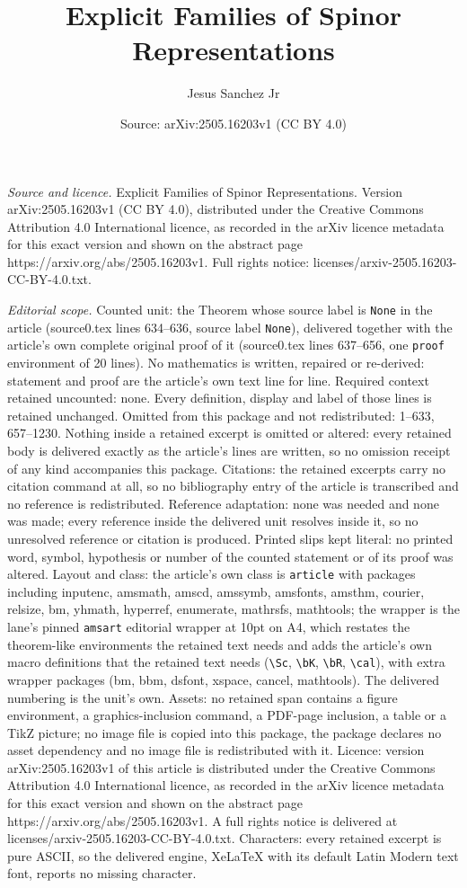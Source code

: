 \documentclass[10pt,a4paper]{amsart}
\title[Explicit Families of Spinor Representations]{Explicit Families of Spinor Representations}
\author{Jesus Sanchez Jr}
\date{Source: arXiv:2505.16203v1 (CC BY 4.0)}
\begin{document}
\maketitle

\noindent\emph{Source and licence.} Explicit Families of Spinor Representations. Version arXiv:2505.16203v1 (CC BY 4.0), distributed under the Creative Commons Attribution 4.0 International licence, as recorded in the arXiv licence metadata for this exact version and shown on the abstract page https://arxiv.org/abs/2505.16203v1. Full rights notice: licenses/arxiv-2505.16203-CC-BY-4.0.txt.\par\smallskip

\noindent\textit{Editorial scope.} Counted unit: the Theorem whose source label is \texttt{None} in the article (source0.tex lines 634--636, source label \texttt{None}), delivered together with the article's own complete original proof of it (source0.tex lines 637--656, one \texttt{proof} environment of 20 lines). No mathematics is written, repaired or re-derived: statement and proof are the article's own text line for line. Required context retained uncounted: none. Every definition, display and label of those lines is retained unchanged. Omitted from this package and not redistributed: 1--633, 657--1230. Nothing inside a retained excerpt is omitted or altered: every retained body is delivered exactly as the article's lines are written, so no omission receipt of any kind accompanies this package. Citations: the retained excerpts carry no citation command at all, so no bibliography entry of the article is transcribed and no reference is redistributed. Reference adaptation: none was needed and none was made; every reference inside the delivered unit resolves inside it, so no unresolved reference or citation is produced. Printed slips kept literal: no printed word, symbol, hypothesis or number of the counted statement or of its proof was altered. Layout and class: the article's own class is \texttt{article} with packages including inputenc, amsmath, amscd, amssymb, amsfonts, amsthm, courier, relsize, bm, yhmath, hyperref, enumerate, mathrsfs, mathtools; the wrapper is the lane's pinned \texttt{amsart} editorial wrapper at 10pt on A4, which restates the theorem-like environments the retained text needs and adds the article's own macro definitions that the retained text needs (\texttt{\textbackslash Sc}, \texttt{\textbackslash bK}, \texttt{\textbackslash bR}, \texttt{\textbackslash cal}), with extra wrapper packages (bm, bbm, dsfont, xspace, cancel, mathtools). The delivered numbering is the unit's own. Assets: no retained span contains a figure environment, a graphics-inclusion command, a PDF-page inclusion, a table or a TikZ picture; no image file is copied into this package, the package declares no asset dependency and no image file is redistributed with it. Licence: version arXiv:2505.16203v1 of this article is distributed under the Creative Commons Attribution 4.0 International licence, as recorded in the arXiv licence metadata for this exact version and shown on the abstract page https://arxiv.org/abs/2505.16203v1. A full rights notice is delivered at licenses/arxiv-2505.16203-CC-BY-4.0.txt. Characters: every retained excerpt is pure ASCII, so the delivered engine, XeLaTeX with its default Latin Modern text font, reports no missing character.
\end{document}
